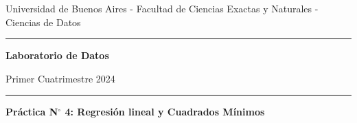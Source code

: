 \documentclass[a4paper,11pt]{article}
\theoremstyle{definition}
\begin{document}
\centerline{{\small Universidad de Buenos Aires - Facultad de Ciencias Exactas y Naturales - Ciencias de Datos}}

\vskip 0.2cm

\hrule

\vskip 0.2cm

 \centerline{{\bf\Large{\sc Laboratorio de Datos}}}

 \vskip 0.2cm

 \centerline{\ttfamily Primer Cuatrimestre 2024}

\vskip 0.2cm

 \hrule

 \bigskip
 \centerline{\bf Práctica N$^\circ$ 4: Regresión lineal y Cuadrados M\'inimos}
 \bigskip


\end{document}
